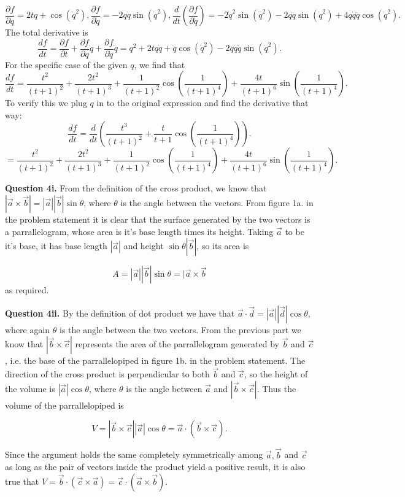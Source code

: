 \documentclass[letterpaper, reqno,11pt]{article}
\begin{document}
\[
\frac{\partial f}{\partial q} =2tq+\cos(\dot q^2), \frac{\partial f}{\partial \dot q} =-2q\dot q \sin(\dot q^2), \frac{d}{dt}\left( \frac{\partial f}{\partial \dot q} \right) =-2\dot q^2 \sin(\dot q^2)-2q\ddot q\sin(\dot q^2)+4q\dot q\ddot q\cos(\dot q^2)
.\]
The total derivative is 
\[
\frac{df}{dt}=\frac{\partial f}{\partial t} +\frac{\partial f}{\partial q} \dot q+\frac{\partial f}{\partial \dot q} \ddot q=q^2+2tq\dot q+\dot q\cos(\dot q^2)-2q\dot q\ddot q \sin(\dot q^2)
.\]
For the specific case of the given $q$, we find that 
\[
\frac{df}{dt}=\frac{t^2}{(t+1)^2}+\frac{2t^2}{(t+1)^3}+\frac{1}{(t+1)^2}\cos\left(\frac{1}{(t+1)^4}\right)+\frac{4t}{(t+1)^6}\sin\left( \frac{1}{(t+1)^4} \right) 
.\]
To verify this we plug $q$ in to the original expression and find the derivative that way: 
\[
\frac{df}{dt}=\frac{d}{dt}\left( \frac{t^3}{(t+1)^2}+\frac{t}{t+1}\cos\left(\frac{1}{(t+1)^4}\right) \right) 
.\]
\[
=\frac{t^2}{(t+1)^2}+\frac{2t^2}{(t+1)^3}+\frac{1}{(t+1)^2}\cos\left(\frac{1}{(t+1)^4}\right)+\frac{4t}{(t+1)^6}\sin\left( \frac{1}{(t+1)^4} \right) 
.\]

{\noindent\bf Question 4i.} From the definition of the cross product, we know that $|\vec a\times\vec b|=|\vec a| |\vec b|\sin\theta$, where $\theta$ is the angle between the vectors. From figure 1a. in the problem statement it is clear that the surface generated by the two vectors is a parrallelogram, whose area is it's base length times its height. Taking $\vec a$ to be it's base, it has base length $|\vec a|$ and height $\sin\theta|\vec b|$, so its area is 

 \[
A=|\vec a| |\vec b|\sin\theta=|\vec a\times\vec b
\]
as required. 

{\noindent\bf Question 4ii.} By the definition of dot product we have that $\vec a\cdot\vec d=|\vec a| |\vec d|\cos\theta$, where again $\theta$ is the angle between the two vectors. From the previous part we know that $|\vec b\times\vec c|$ represents the area of the parrallelogram generated by $\vec b$ and $\vec c$, i.e. the base of the parrallelopiped in figure 1b. in the problem statement. The direction of the cross product is perpendicular to both $\vec b$ and $\vec c$, so the height of the volume is $|\vec a|\cos\theta$, where $\theta$ is the angle between $\vec a$ and $|\vec b\times\vec c|$. Thus the volume of the parrallelopiped is 

\[
V=|\vec b\times\vec c| |\vec a|\cos\theta=\vec a\cdot (\vec b\times \vec c)
.\]

Since the argument holds the same completely symmetrically among $\vec a, \vec b$ and $\vec c$ as long as the pair of vectors inside the product yield a positive result, it is also true that $V=\vec b\cdot (\vec c\times\vec a)=\vec c\cdot(\vec a\times\vec b)$. 
\end{document}

